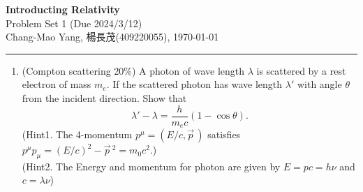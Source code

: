 \documentclass[12pt]{article}%
\begin{document}
\begin{center}
\textbf{\Large Introducting Relativity}
\\\vspace{10pt}
{Problem Set 1 (Due 2024/3/12)}
\\\vspace{10pt}
Chang-Mao Yang, 楊長茂(409220055), \today

\vspace{5pt}
\hrule
\end{center}


\begin{enumerate}

\item (Compton scattering 20\%) A photon of wave length $\lambda$ is scattered by a rest electron of mass $m_e$. If the scattered photon has wave length $\lambda'$ with angle $\theta$ from the incident direction. Show that
\begin{equation*}
\lambda' - \lambda = \frac{h}{m_ec} \left(1-\cos\theta\right).
\end{equation*}
(Hint1. The 4-momentum $p^{\mu} = (E/c, \vec{p}\,)$ satisfies $p^{\mu}p_{\mu} = (E/c)^2 - \vec{p}\,^2 = m_0c^2$.)\\
(Hint2. The Energy and momentum for photon are given by $E = pc=h\nu$ and $c=\lambda \nu$)

\noindent{}
\end{enumerate}
\end{document}
